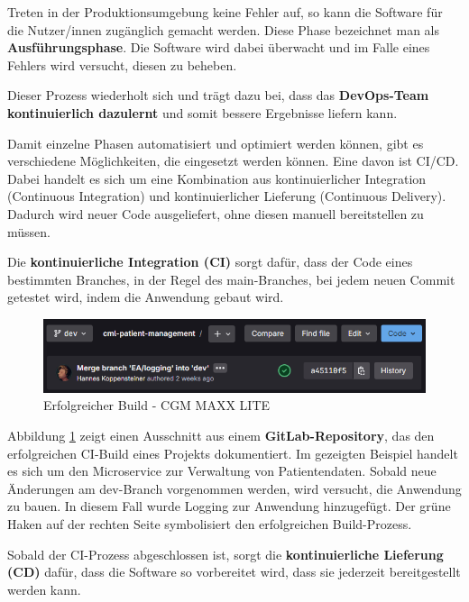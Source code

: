     Treten in der Produktionsumgebung keine Fehler auf, so kann die Software für die Nutzer/innen zugänglich gemacht werden. Diese Phase bezeichnet man als \textbf{Ausführungsphase}. Die Software wird dabei überwacht und im Falle eines Fehlers wird versucht, diesen zu beheben. 

    Dieser Prozess wiederholt sich und trägt dazu bei, dass das \textbf{DevOps-Team kontinuierlich dazulernt} und somit bessere Ergebnisse liefern kann.
    \cite{EA:Web35, EA:Web37}

    Damit einzelne Phasen automatisiert und optimiert werden können, gibt es verschiedene Möglichkeiten, die eingesetzt werden können.
    Eine davon ist CI/CD. Dabei handelt es sich um eine Kombination aus kontinuierlicher Integration (Continuous Integration) und kontinuierlicher Lieferung (Continuous Delivery). Dadurch wird neuer Code ausgeliefert, ohne diesen manuell bereitstellen zu müssen.

    Die \textbf{kontinuierliche Integration (CI)} sorgt dafür, dass der Code eines bestimmten Branches, in der Regel des main-Branches, bei jedem neuen Commit getestet wird, indem die Anwendung gebaut wird.

    \begin{figure}[H]
        \centering
        \includegraphics[width=1\linewidth]{images/EA/cml-ci-passed.png}
        \caption{Erfolgreicher Build - CGM MAXX LITE}
        \label{fig:cml-ci-passed}
    \end{figure}

    Abbildung \ref{fig:cml-ci-passed} zeigt einen Ausschnitt aus einem \textbf{GitLab-Repository}, das den erfolgreichen CI-Build eines Projekts dokumentiert.
    Im gezeigten Beispiel handelt es sich um den Microservice zur Verwaltung von Patientendaten. Sobald neue Änderungen am dev-Branch vorgenommen werden, wird versucht, die Anwendung zu bauen. In diesem Fall wurde Logging zur Anwendung hinzugefügt. Der grüne Haken auf der rechten Seite symbolisiert den erfolgreichen Build-Prozess.

    Sobald der CI-Prozess abgeschlossen ist, sorgt die \textbf{kontinuierliche Lieferung (CD)} dafür, dass die Software so vorbereitet wird, dass sie jederzeit bereitgestellt werden kann.
    \cite{EA:Web38}
    

